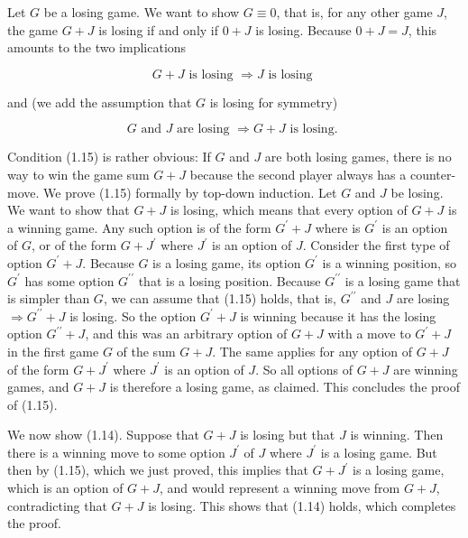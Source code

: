 \documentclass[12pt]{article}
\begin{document}
Let $G$ be a losing game. We want to show $G \equiv 0$, that is, for any other game $J$, the game $G+J$ is losing if and only if $0+J$ is losing. Because $0+J=J$, this amounts to the two implications


\begin{equation*}
G+J \text { is losing } \Rightarrow J \text { is losing } \tag{1.14}
\end{equation*}


and (we add the assumption that $G$ is losing for symmetry)


\begin{equation*}
G \text { and } J \text { are losing } \Rightarrow G+J \text { is losing. } \tag{1.15}
\end{equation*}


Condition (1.15) is rather obvious: If $G$ and $J$ are both losing games, there is no way to win the game sum $G+J$ because the second player always has a counter-move. We prove (1.15) formally by top-down induction. Let $G$ and $J$ be losing. We want to show that $G+J$ is losing, which means that every option of $G+J$ is a winning game. Any such option is of the form $G^{\prime}+J$ where is $G^{\prime}$ is an option of $G$, or of the form $G+J^{\prime}$ where $J^{\prime}$ is an option of $J$. Consider the first type of option $G^{\prime}+J$. Because $G$ is a losing game, its option $G^{\prime}$ is a winning position, so $G^{\prime}$ has some option $G^{\prime \prime}$ that is a losing position. Because $G^{\prime \prime}$ is a losing game that is simpler than $G$, we can assume that (1.15) holds, that is, $G^{\prime \prime}$ and $J$ are losing $\Rightarrow G^{\prime \prime}+J$ is losing. So the option $G^{\prime}+J$ is winning because it has the losing option $G^{\prime \prime}+J$, and this was an arbitrary option of $G+J$ with a move to $G^{\prime}+J$ in the first game $G$ of the sum $G+J$. The same applies for any option of $G+J$ of the form $G+J^{\prime}$ where $J^{\prime}$ is an option of $J$. So all options of $G+J$ are winning games, and $G+J$ is therefore a losing game, as claimed. This concludes the proof of (1.15).

We now show (1.14). Suppose that $G+J$ is losing but that $J$ is winning. Then there is a winning move to some option $J^{\prime}$ of $J$ where $J^{\prime}$ is a losing game. But then by (1.15), which we just proved, this implies that $G+J^{\prime}$ is a losing game, which is an option of $G+J$, and would represent a winning move from $G+J$, contradicting that $G+J$ is losing. This shows that (1.14) holds, which completes the proof.
\end{document}
